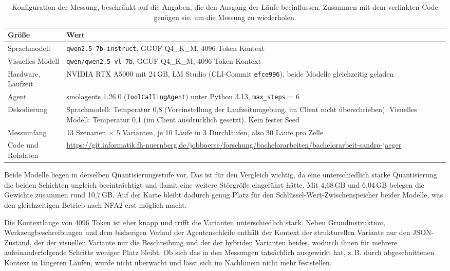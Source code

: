 \begin{table}[htbp]
  \centering
  \caption{Konfiguration der Messung, beschränkt auf die Angaben, die den
           Ausgang der Läufe beeinflussen. Zusammen mit dem verlinkten Code
           genügen sie, um die Messung zu wiederholen.}
  \label{tab:config}
  \small
  \setlength{\tabcolsep}{5pt}
  \renewcommand{\arraystretch}{1.3}
  \begin{tabular}{@{}p{3.4cm} p{9.6cm}@{}}
    \toprule
    Größe & Wert \\
    \midrule
    Sprachmodell      & \texttt{qwen2.5-7b-instruct}, GGUF Q4\_K\_M, 4096 Token Kontext \\
    Visuelles Modell  & \texttt{qwen/qwen2.5-vl-7b}, GGUF Q4\_K\_M, 4096 Token Kontext \\
    Hardware, Laufzeit & NVIDIA RTX A5000 mit 24\,GB, LM Studio (CLI-Commit \texttt{efce996}), beide Modelle gleichzeitig geladen \\
    Agent             & smolagents 1.26.0 (\texttt{ToolCallingAgent}) unter Python 3.13, \texttt{max\_steps} = 6 \\
    Dekodierung       & Sprachmodell: Temperatur 0{,}8 (Voreinstellung der Laufzeitumgebung, im Client nicht überschrieben). Visuelles Modell: Temperatur 0{,}1 (im Client ausdrücklich gesetzt). Kein fester Seed \\
    Messumfang        & 13 Szenarien $\times$ 5 Varianten, je 10 Läufe in 3 Durchläufen, also 30 Läufe pro Zelle \\
    Code und Rohdaten & \url{https://git.informatik.fh-nuernberg.de/jobboerse/forschung/bachelorarbeiten/bachelorarbeit-sandro-jaeger} \\
    \bottomrule
  \end{tabular}
\end{table}

Beide Modelle liegen in derselben Quantisierungsstufe vor.
Das ist für den Vergleich wichtig, da eine unterschiedlich starke Quantisierung die beiden Schichten ungleich beeinträchtigt und damit eine weitere Störgröße eingeführt hätte.
Mit 4{,}68\,GB und 6{,}04\,GB belegen die Gewichte zusammen rund 10{,}7\,GB.
Auf der Karte bleibt dadurch genug Platz für den Schlüssel-Wert-Zwischenspeicher beider Modelle, was den gleichzeitigen Betrieb nach NFA2 erst möglich macht.

Die Kontextlänge von 4096 Token ist eher knapp und trifft die Varianten unterschiedlich stark.
Neben Grundinstruktion, Werkzeugbeschreibungen und dem bisherigen Verlauf der Agentenschleife enthält der Kontext der strukturellen Variante nur den JSON-Zustand, der der visuellen Variante nur die Beschreibung und der der hybriden Varianten beides, wodurch ihnen für mehrere aufeinanderfolgende Schritte weniger Platz bleibt.
Ob sich das in den Messungen tatsächlich ausgewirkt hat, z.\,B. durch abgeschnittenen Kontext in längeren Läufen, wurde nicht überwacht und lässt sich im Nachhinein nicht mehr feststellen.

